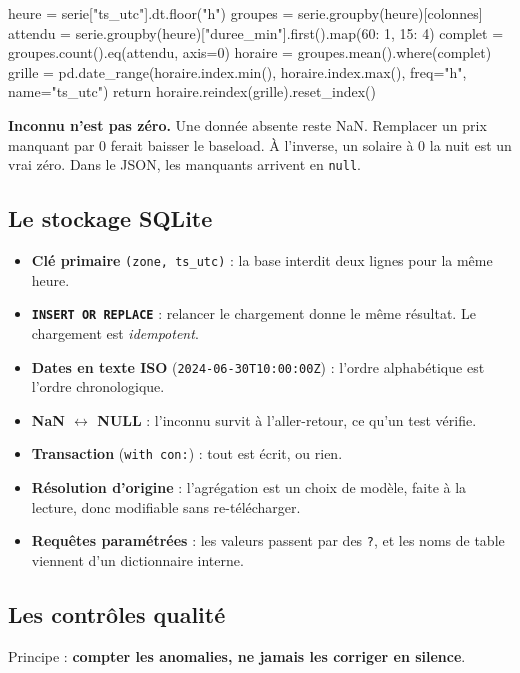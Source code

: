 \documentclass[11pt,a4paper]{article}
\newcommand{\code}[1]{\texttt{\small #1}}
\begin{document}
\begin{codepy}
heure = serie["ts_utc"].dt.floor("h")
groupes = serie.groupby(heure)[colonnes]
attendu = serie.groupby(heure)["duree_min"].first().map({60: 1, 15: 4})
complet = groupes.count().eq(attendu, axis=0)
horaire = groupes.mean().where(complet)
grille = pd.date_range(horaire.index.min(), horaire.index.max(), freq="h", name="ts_utc")
return horaire.reindex(grille).reset_index()
\end{codepy}

\begin{attention}
\textbf{Inconnu n'est pas zéro.} Une donnée absente reste NaN. Remplacer un prix manquant par 0 ferait baisser le baseload. À l'inverse,
un solaire à 0 la nuit est un vrai zéro. Dans le JSON, les manquants arrivent en \code{null}.
\end{attention}

\subsection{Le stockage SQLite}

\begin{itemize}
\item \textbf{Clé primaire} \code{(zone, ts\_utc)} : la base interdit deux lignes pour la même heure.
\item \textbf{\code{INSERT OR REPLACE}} : relancer le chargement donne le même résultat. Le chargement est \emph{idempotent}.
\item \textbf{Dates en texte ISO} (\code{2024-06-30T10:00:00Z}) : l'ordre alphabétique est l'ordre chronologique.
\item \textbf{NaN $\leftrightarrow$ NULL} : l'inconnu survit à l'aller-retour, ce qu'un test vérifie.
\item \textbf{Transaction} (\code{with con:}) : tout est écrit, ou rien.
\item \textbf{Résolution d'origine} : l'agrégation est un choix de modèle, faite à la lecture, donc modifiable sans re-télécharger.
\item \textbf{Requêtes paramétrées} : les valeurs passent par des \code{?}, et les noms de table viennent d'un dictionnaire interne.
\end{itemize}

\subsection{Les contrôles qualité}

Principe : \textbf{compter les anomalies, ne jamais les corriger en silence}.
\end{document}
